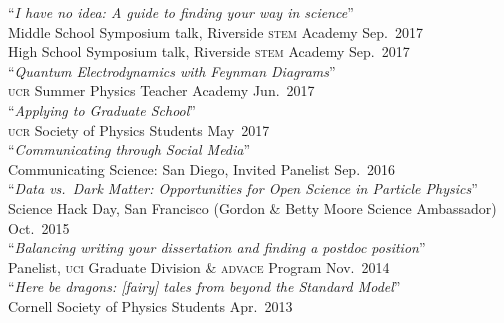 \documentclass[margin,line]{resume}
\newcommand{\mytalksep}{-.1mm}
\newcommand{\mytalkskip}{2mm}
\newcommand{\scap}[1]{\textsc{\MakeLowercase{#1}}}
\begin{document}
\begin{resume}
%
``\emph{I have no idea: A guide to finding your way in science}''\vspace{\mytalksep}\\ 
Middle School Symposium talk, Riverside \scap{STEM} Academy \hfill Sep.~{2017}\vspace{\mytalksep}\\ 
High School Symposium talk, Riverside \scap{STEM} Academy 
\hfill Sep.~{2017}\vspace{\mytalkskip}\\ 
%
``\emph{Quantum Electrodynamics with Feynman Diagrams}''\vspace{\mytalksep}\\ 
\scap{UCR} Summer Physics Teacher Academy \hfill Jun.~{2017}\vspace{\mytalkskip}\\ 
%
``\emph{Applying to Graduate School}''\vspace{\mytalksep}\\ 
\scap{UCR} Society of Physics Students \hfill May~{2017}\vspace{\mytalkskip}\\ 
%
``\emph{Communicating through Social Media}''\vspace{\mytalksep}\\ 
Communicating Science: San Diego, Invited Panelist \hfill Sep.~{2016}\vspace{\mytalkskip}\\ 
%
``\emph{Data vs.\ Dark Matter: Opportunities for Open Science in Particle Physics}''\vspace{\mytalksep}\\ 
Science Hack Day, San Francisco (Gordon \& Betty Moore Science Ambassador) \hfill Oct.~{2015}\vspace{\mytalkskip}\\ 
%
``\emph{Balancing writing your dissertation and finding a postdoc position}''\vspace{\mytalksep}\\ 
Panelist, \scap{UCI} Graduate Division \& \textsc{advace} Program \hfill Nov.~{2014}\vspace{\mytalkskip}\\ 
%
``\emph{Here be dragons: [fairy] tales from beyond the Standard Model}''\vspace{\mytalksep}\\ 
Cornell Society of Physics Students \hfill Apr.~{2013}\vspace{\mytalkskip}\\ 

\end{resume}
\end{document}
